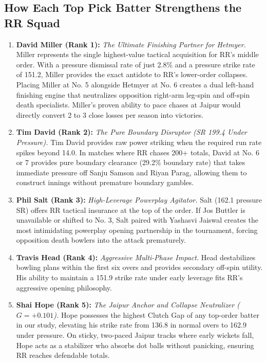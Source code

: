 \documentclass[11pt,a4paper]{article}
\begin{document}
\subsection{How Each Top Pick Batter Strengthens the RR Squad}
\begin{enumerate}
    \item \textbf{David Miller (Rank 1):} \textit{The Ultimate Finishing Partner for Hetmyer.} Miller represents the single highest-value tactical acquisition for RR's middle order. With a pressure dismissal rate of just 2.8\% and a pressure strike rate of 151.2, Miller provides the exact antidote to RR's lower-order collapses. Placing Miller at No. 5 alongside Hetmyer at No. 6 creates a dual left-hand finishing engine that neutralizes opposition right-arm leg-spin and off-spin death specialists. Miller's proven ability to pace chases at Jaipur would directly convert 2 to 3 close losses per season into victories.
    \item \textbf{Tim David (Rank 2):} \textit{The Pure Boundary Disruptor (SR 199.4 Under Pressure).} Tim David provides raw power striking when the required run rate spikes beyond 14.0. In matches where RR chases 200+ totals, David at No. 6 or 7 provides pure boundary clearance (29.2\% boundary rate) that takes immediate pressure off Sanju Samson and Riyan Parag, allowing them to construct innings without premature boundary gambles.
    \item \textbf{Phil Salt (Rank 3):} \textit{High-Leverage Powerplay Agitator.} Salt (162.1 pressure SR) offers RR tactical insurance at the top of the order. If Jos Buttler is unavailable or shifted to No. 3, Salt paired with Yashasvi Jaiswal creates the most intimidating powerplay opening partnership in the tournament, forcing opposition death bowlers into the attack prematurely.
    \item \textbf{Travis Head (Rank 4):} \textit{Aggressive Multi-Phase Impact.} Head destabilizes bowling plans within the first six overs and provides secondary off-spin utility. His ability to maintain a 151.9 strike rate under early leverage fits RR's aggressive opening philosophy.
    \item \textbf{Shai Hope (Rank 5):} \textit{The Jaipur Anchor and Collapse Neutralizer ($G = +0.101$).} Hope possesses the highest Clutch Gap of any top-order batter in our study, elevating his strike rate from 136.8 in normal overs to 162.9 under pressure. On sticky, two-paced Jaipur tracks where early wickets fall, Hope acts as a stabilizer who absorbs dot balls without panicking, ensuring RR reaches defendable totals.

\end{enumerate}
\end{document}
